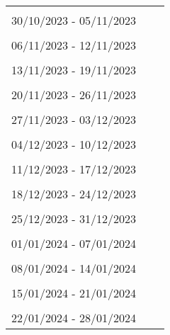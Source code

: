 \begin{table} [htb]
\centering
\begin{tabular}{p{10cm}c r} \\
\hline \\ 
 30/10/2023 - 05/11/2023\\ 
\hline \\ 
 06/11/2023 - 12/11/2023\\ 
\hline \\ 
 13/11/2023 - 19/11/2023\\ 
\hline \\ 
 20/11/2023 - 26/11/2023\\ 
\hline \\ 
 27/11/2023 - 03/12/2023\\ 
\hline \\ 
 04/12/2023 - 10/12/2023\\ 
\hline \\ 
 11/12/2023 - 17/12/2023\\ 
\hline \\ 
 18/12/2023 - 24/12/2023\\ 
\hline \\ 
 25/12/2023 - 31/12/2023\\ 
\hline \\ 
 01/01/2024 - 07/01/2024\\ 
\hline \\ 
 08/01/2024 - 14/01/2024\\ 
\hline \\ 
 15/01/2024 - 21/01/2024\\ 
\hline \\ 
 22/01/2024 - 28/01/2024\\ 

\end{tabular}
\end{table}
\bottomrule

